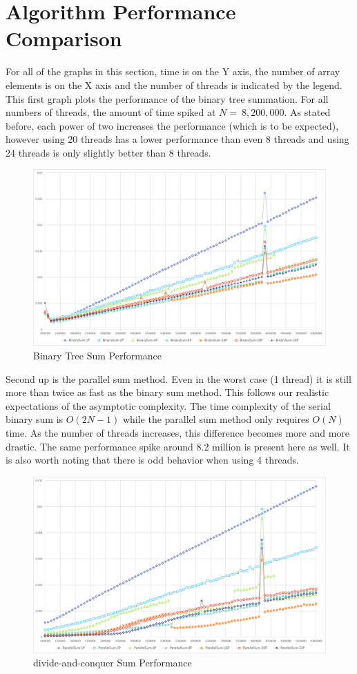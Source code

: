 \documentclass[a4paper, 11pt]{article}
\begin{document}
\section*{Algorithm Performance Comparison}
For all of the graphs in this section, time is on the Y axis, the number of array elements is on the X axis and the number of threads is indicated by the legend. This first graph plots the performance of the binary tree summation. For all numbers of threads, the amount of time spiked at $N = ~8,200,000$. As stated before, each power of two increases the performance (which is to be expected), however using 20 threads has a lower performance than even 8 threads and using 24 threads is only slightly better than 8 threads.

\begin{figure}[H]
	\centering
	\includegraphics[width=\textwidth]{binary_sum.png}
	\caption{Binary Tree Sum Performance}
\end{figure}

Second up is the parallel sum method. Even in the worst case (1 thread) it is still more than twice as fast as the binary sum method. This follows our realistic expectations of the asymptotic complexity. The time complexity of the serial binary sum is $O(2N-1)$ while the parallel sum method only requires $O(N)$ time. As the number of threads increases, this difference becomes more and more drastic. The same performance spike around 8.2 million is present here as well. It is also worth noting that there is odd behavior when using 4 threads.
\begin{figure}[H]
	\centering
	\includegraphics[width=\textwidth]{parallel_sum.png}
	\caption{divide-and-conquer Sum Performance}
\end{figure}
\end{document}
